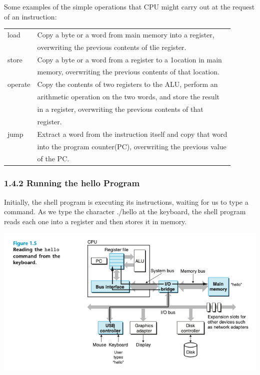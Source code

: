 \documentclass[11pt]{article}
\begin{document}
\begin{enumerate}
Some examples of the simple operations that CPU might carry out at the request of an instruction:\\
\begin{center}
\begin{tabular}{|l|l|}
\hline
load & Copy a byte or a word from main memory into a register, \\
 & overwriting the previous contents of tlie register. \\
\hline
store & Copy a byte or a word from a register to a 1ocation in main \\
 & memory, overwriting the previous contents of that location. \\
\hline
operate & Copy the contents of two registers to the ALU, perform an \\
 & arithmetic operation on the two words, and store the result \\
 & in a register, overwriting the previous contents of that \\
 & register. \\
\hline
jump & Extract a word from the instruction itself and copy that word \\
 & into the program counter(PC), overwriting the previous value \\
 & of the PC. \\
\hline
\end{tabular}
\end{center}
\end{enumerate}
\subsubsection{1.4.2 Running the hello Program}
\label{sec:orgc71645e}
Initially, the shell program is executing its instructions, waiting for us to type a command. As we type the character ./hello at the keyboard, the shell program reads each one into a register and then stores it in memory.\\

\begin{center}
\includegraphics[width=.9\linewidth]{pics/read-the-hello.png}
\end{center}
\end{document}
